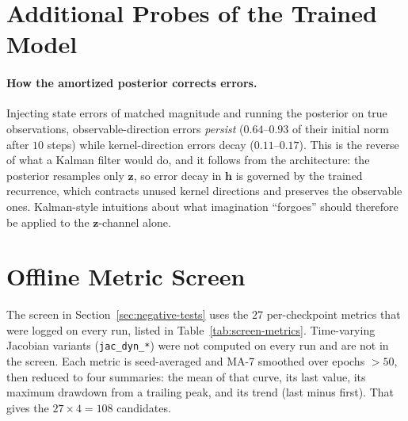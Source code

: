 \documentclass[11pt]{article}
\theoremstyle{remark}
\begin{document}
\section{Additional Probes of the Trained Model}
\label{sec:app-probes}

\paragraph{How the amortized posterior corrects errors.} Injecting state errors of matched magnitude and running the posterior on true observations, observable-direction errors \emph{persist} ($0.64$--$0.93$ of their initial norm after $10$ steps) while kernel-direction errors decay ($0.11$--$0.17$). This is the reverse of what a Kalman filter would do, and it follows from the architecture: the posterior resamples only $\bm{z}$, so error decay in $\bm{h}$ is governed by the trained recurrence, which contracts unused kernel directions and preserves the observable ones. Kalman-style intuitions about what imagination ``forgoes'' should therefore be applied to the $\bm{z}$-channel alone.
\section{Offline Metric Screen}
\label{sec:app-metrics}

The screen in Section~\ref{sec:negative-tests} uses the $27$ per-checkpoint metrics that were logged on every run, listed in Table~\ref{tab:screen-metrics}. Time-varying Jacobian variants (\texttt{jac\_dyn\_*}) were not computed on every run and are not in the screen. Each metric is seed-averaged and MA-7 smoothed over epochs $>50$, then reduced to four summaries: the mean of that curve, its last value, its maximum drawdown from a trailing peak, and its trend (last minus first). That gives the $27{\times}4{=}108$ candidates.
\end{document}
